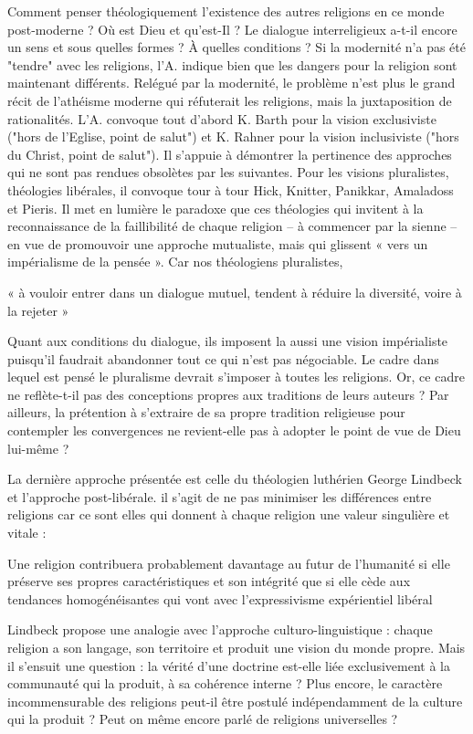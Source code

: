 Comment penser théologiquement l'existence des autres religions en ce monde post-moderne ? Où est Dieu et qu’est-Il ? Le dialogue interreligieux a-t-il encore un sens et sous quelles formes ? À quelles conditions ?
Si la modernité n'a pas été "tendre" avec les religions, l'A. indique bien que les dangers pour la religion sont maintenant différents. Relégué par la modernité, le problème n'est plus le grand récit de l'athéisme moderne qui réfuterait les religions, mais la juxtaposition de  rationalités. L'A. convoque tout d'abord K. Barth pour la vision exclusiviste ("hors de l'Eglise, point de salut") et K. Rahner pour la vision inclusiviste ("hors du Christ, point de salut"). Il s'appuie à démontrer la pertinence des approches qui ne sont pas rendues obsolètes par les suivantes.
Pour les visions pluralistes, théologies libérales, il convoque  tour à tour Hick, Knitter, Panikkar, Amaladoss et Pieris. Il met en lumière le paradoxe que ces théologies qui invitent à la reconnaissance de la faillibilité de chaque religion – à commencer par la sienne – en vue de promouvoir une approche mutualiste, mais qui glissent « vers un impérialisme de la pensée ». Car nos théologiens pluralistes, 
\begin{singlequote}
    « à vouloir entrer dans un dialogue mutuel, tendent à réduire la diversité, voire à la rejeter »  \cite[p. 104]{cheno_dieu_2017}
\end{singlequote}

Quant aux conditions du dialogue, ils imposent la aussi une vision impérialiste puisqu’il faudrait abandonner tout ce qui n’est pas négociable. Le cadre dans lequel est pensé le pluralisme devrait s’imposer à toutes les religions. Or, ce cadre ne reflète-t-il pas des conceptions propres aux traditions de leurs auteurs ? Par ailleurs, la prétention à s’extraire de sa propre tradition religieuse pour contempler les convergences ne revient-elle pas à adopter le point de vue de Dieu lui-même ? \cite{pisani_cheno_2018}

La dernière approche présentée est celle du théologien luthérien George Lindbeck \cite{lindbeck_nature_2002}et l'approche post-libérale. il s'agit de ne pas minimiser les différences entre religions  car ce sont elles  qui donnent à chaque religion une valeur singulière et vitale : 
\begin{singlequote}
     Une religion contribuera probablement davantage au futur de l’humanité si elle préserve ses propres caractéristiques et son intégrité que si elle cède aux tendances homogénéisantes qui vont avec l’expressivisme expérientiel libéral \cite[p. 115]{cheno_dieu_2017} 
\end{singlequote}
Lindbeck propose une analogie avec l'approche culturo-linguistique : chaque religion a son langage, son territoire et produit une vision du monde propre. 
Mais il s’ensuit une question : la vérité d’une doctrine est-elle liée exclusivement à la communauté qui la produit, à sa cohérence interne ? Plus encore, le caractère incommensurable des religions peut-il être postulé indépendamment de la culture qui la produit ? Peut on même encore parlé de religions universelles ? 

